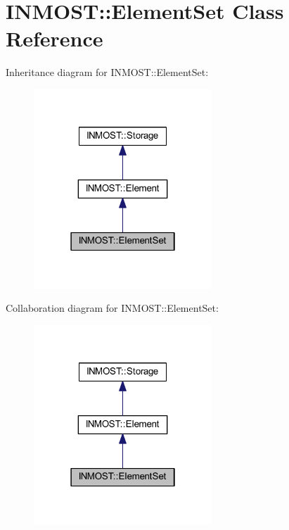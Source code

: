 \hypertarget{classINMOST_1_1ElementSet}{\section{I\-N\-M\-O\-S\-T\-:\-:Element\-Set Class Reference}
\label{classINMOST_1_1ElementSet}
}


Inheritance diagram for I\-N\-M\-O\-S\-T\-:\-:Element\-Set\-:\nopagebreak
\begin{figure}[H]
\begin{center}
\leavevmode
\includegraphics[width=190pt]{classINMOST_1_1ElementSet__inherit__graph}
\end{center}
\end{figure}


Collaboration diagram for I\-N\-M\-O\-S\-T\-:\-:Element\-Set\-:\nopagebreak
\begin{figure}[H]
\begin{center}
\leavevmode
\includegraphics[width=190pt]{classINMOST_1_1ElementSet__coll__graph}
\end{center}
\end{figure}
